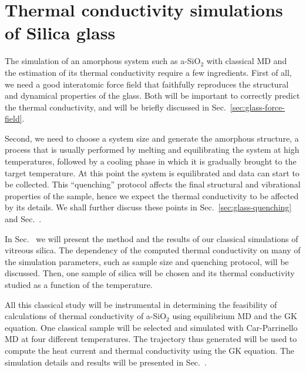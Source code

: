 \chapter{Thermal conductivity simulations of Silica glass}


The simulation of an amorphous system such as a-SiO$_2$ with classical MD and the estimation of its thermal conductivity require a few ingredients. 
First of all, we need a good interatomic force field that faithfully reproduces the structural and dynamical properties of the glass. Both will be important to correctly predict the thermal conductivity, and will be briefly discussed in Sec.~\ref{sec:glass-force-field}.

Second, we need to choose a system size and generate the amorphous structure, a process that is usually performed by melting and equilibrating the system at high temperatures, followed by a cooling phase in which it is gradually brought to the target temperature. At this point the system is equilibrated and data can start to be collected. This ``quenching'' protocol affects the final structural and vibrational properties of the sample, hence we expect the thermal conductivity to be affected by its details. We shall further discuss these points in Sec.~\ref{sec:glass-quenching} and Sec.~.

In Sec.~ we will present the method and the results of our classical simulations of vitreous silica. The dependency of the computed thermal conductivity on many of the simulation parameters, such as sample size and quenching protocol, will be discussed. 
Then, one  sample of silica will be chosen and its thermal conductivity studied as a function of the temperature. 


All this classical study will be instrumental in determining the feasibility of \abinitio calculations of thermal conductivity of a-SiO$_2$ using equilibrium MD and the GK equation. One classical sample will be selected and simulated with Car-Parrinello \abinitio MD at four different temperatures. The trajectory thus generated will be used to compute the \abinitio heat current and thermal conductivity using the GK equation. The simulation details and results will be presented in Sec.~.



